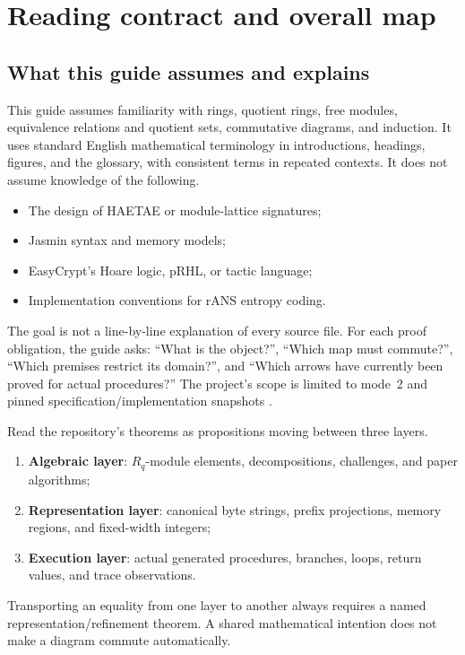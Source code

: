 \section{Reading contract and overall map}
\label{sec:reading-contract}

\subsection{What this guide assumes and explains}

This guide assumes familiarity with rings, quotient rings, free modules,
equivalence relations and quotient sets, commutative diagrams, and induction.
It uses standard English mathematical terminology in introductions, headings,
figures, and the glossary, with consistent terms in repeated contexts.
It does not assume knowledge of the following.

\begin{itemize}
  \item The design of HAETAE or module-lattice signatures;
  \item Jasmin syntax and memory models;
  \item EasyCrypt's Hoare logic, pRHL, or tactic language;
  \item Implementation conventions for rANS entropy coding.
\end{itemize}

The goal is not a line-by-line explanation of every source file.
For each proof obligation, the guide asks: “What is the object?”,
“Which map must commute?”, “Which premises restrict its domain?”,
and “Which arrows have currently been proved for actual procedures?”
The project's scope is limited to mode~2 and pinned specification/implementation
snapshots \cite{project-scope}.

\begin{translation}
Read the repository's theorems as propositions moving between three layers.
\begin{enumerate}
  \item \textbf{Algebraic layer}: \(R_q\)-module elements, decompositions,
        challenges, and paper algorithms;
  \item \textbf{Representation layer}: canonical byte strings, prefix
        projections, memory regions, and fixed-width integers;
  \item \textbf{Execution layer}: actual generated procedures, branches,
        loops, return values, and trace observations.
\end{enumerate}
Transporting an equality from one layer to another always requires a named
representation/refinement theorem. A shared mathematical intention does not
make a diagram commute automatically.
\end{translation}

